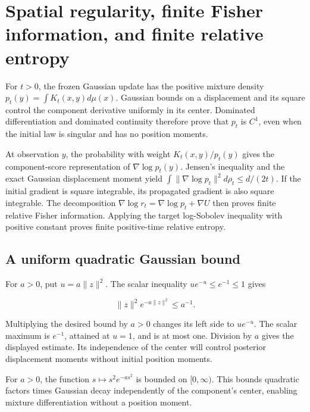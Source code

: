 \documentclass[11pt,a4paper]{report}
\begin{document}
\section{\texorpdfstring{Spatial regularity, finite Fisher information, and finite relative entropy}{Spatial regularity, finite Fisher information, and finite relative entropy}}
\label{proof-module-UnadjustedLangevin-LSI-GaussianEntropy-lean}


For \(t>0\), the frozen Gaussian update has the positive mixture density \(p_t(y)=\int K_t(x,y)d\mu(x)\). Gaussian bounds on a displacement and its square control the component derivative uniformly in its center. Dominated differentiation and dominated continuity therefore prove that \(p_t\) is \(C^1\), even when the initial law is singular and has no position moments.



At observation \(y\), the probability with weight \(K_t(x,y)/p_t(y)\) gives the component-score representation of \(\nabla\log p_t(y)\). Jensen's inequality and the exact Gaussian displacement moment yield \(\int\|\nabla\log p_t\|^2d\rho_t\le d/(2t)\). If the initial gradient is square integrable, its propagated gradient is also square integrable. The decomposition \(\nabla\log r_t=\nabla\log p_t+\nabla U\) then proves finite relative Fisher information. Applying the target log-Sobolev inequality with positive constant proves finite positive-time relative entropy.

\subsection{\texorpdfstring{A uniform quadratic Gaussian bound}{A uniform quadratic Gaussian bound}}
\label{report-step-UnadjustedLangevin-LSI-GaussianEntropy-lean-1}


For \(a>0\), put \(u=a\|z\|^2\). The scalar inequality \(u e^{-u}\le e^{-1}\le1\) gives

\[\|z\|^2e^{-a\|z\|^2}\le a^{-1}.\]

Multiplying the desired bound by \(a>0\) changes its left side to \(u e^{-u}\). The scalar maximum is \(e^{-1}\), attained at \(u=1\), and is at most one. Division by \(a\) gives the displayed estimate. Its independence of the center will control posterior displacement moments without initial position moments.



For \(a>0\), the function \(s\mapsto s^2e^{-as^2}\) is bounded on \([0,\infty)\). This bounds quadratic factors times Gaussian decay independently of the component's center, enabling mixture differentiation without a position moment.
\end{document}
